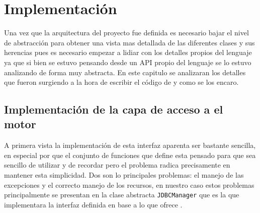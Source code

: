 \chapter{Implementación}
Una vez que la arquitectura del proyecto fue definida es necesario bajar el nivel de abstracción para obtener una vista mas detallada de las diferentes clases y sus herencias pues es necesario empezar a lidiar con los detalles propios del lenguaje ya que si bien se estuvo pensando desde un API propio del lenguaje se lo estuvo analizando de forma muy abstracta. En este capitulo se analizaran los detalles que fueron surgiendo a la hora de escribir el código de \jj y como se los encaro.
%
%
%
\section{Implementación de la capa de acceso a el motor}
A primera vista la implementación de esta interfaz aparenta ser bastante sencilla, en especial por que el conjunto de funciones que define esta pensado para que sea sencillo de utilizar y de recordar pero el problema radica precisamente en mantener esta simplicidad. Dos son lo principales problemas: el manejo de las excepciones y el correcto manejo de los recursos, en nuestro caso estos problemas principalmente se presentan en la clase abstracta \verb=JDBCManager= que es la que implementara la interfaz definida en base a lo que ofrece \jd.
%
